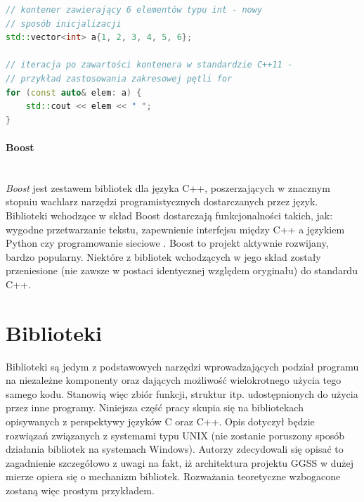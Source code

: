 \begin{lstlisting}[language=c++,caption={Przykład kodu w języku C++ napisany z wykorzystaniem funkcjonalności ze standardu C++11 (zakresowa pętla for)},label={lst:cpp11}]
// kontener zawierający 6 elementów typu int - nowy
// sposób inicjalizacji
std::vector<int> a{1, 2, 3, 4, 5, 6};

// iteracja po zawartości kontenera w standardzie C++11 - 
// przykład zastosowania zakresowej pętli for
for (const auto& elem: a) {
	std::cout << elem << " ";
}
\end{lstlisting}


\paragraph*{Boost}\mbox{} \\
\textit{Boost} jest zestawem bibliotek dla języka C++, poszerzających w znacznym stopniu wachlarz narzędzi programistycznych dostarczanych przez język. Biblioteki wchodzące w skład Boost dostarczają funkcjonalności takich, jak: wygodne przetwarzanie tekstu, zapewnienie interfejsu między C++ a językiem Python czy programowanie sieciowe \cite{BoostDocs}. Boost to projekt aktywnie rozwijany, bardzo popularny. Niektóre z bibliotek wchodzących w jego skład zostały przeniesione (nie zawsze w postaci identycznej względem oryginału) do standardu C++.

\section{Biblioteki}
Biblioteki są jedym z podstawowych narzędzi wprowadzających podział programu na niezależne komponenty oraz dających możliwość wielokrotnego użycia tego samego kodu. Stanowią więc zbiór funkcji, struktur itp. udostępnionych do użycia przez inne programy. Niniejsza część pracy skupia się na bibliotekach opisywanych z perspektywy języków C oraz C++. Opis dotyczył będzie rozwiązań związanych z systemami typu UNIX (nie zostanie poruszony sposób działania bibliotek na systemach Windows). Autorzy zdecydowali się opisać to zagadnienie szczegółowo z uwagi na fakt, iż architektura projektu GGSS w dużej mierze opiera się o mechanizm bibliotek. Rozważania teoretyczne wzbogacone zostaną więc prostym przykładem.

